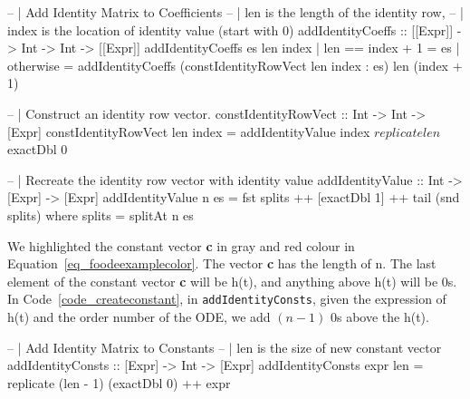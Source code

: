 \begin{listing}
\begin{haskell1}
-- | Add Identity Matrix to Coefficients
-- | len is the length of the identity row,
-- | index is the location of identity value (start with 0)
addIdentityCoeffs :: [[Expr]] -> Int -> Int -> [[Expr]]
addIdentityCoeffs es len index
  | len == index + 1 = es
  | otherwise = addIdentityCoeffs (constIdentityRowVect len index : es) len (index + 1)

-- | Construct an identity row vector.
constIdentityRowVect :: Int -> Int -> [Expr]
constIdentityRowVect len index = addIdentityValue index $ replicate len $ exactDbl 0

-- | Recreate the identity row vector with identity value 
addIdentityValue :: Int -> [Expr] -> [Expr]
addIdentityValue n es = fst splits ++ [exactDbl 1] ++ tail (snd splits)
  where splits = splitAt n es
\end{haskell1}
\label{code_createidentity}
\end{listing}

We highlighted the constant vector \textbf{c} in gray and red colour in Equation~\ref{eq_foodeexamplecolor}. The vector \textbf{c} has the length of n. The last element of the constant vector \textbf{c} will be h(t), and anything above h(t) will be 0s. In Code~\ref{code_createconstant}, in \verb|addIdentityConsts|, given the expression of h(t) and the order number of the ODE, we add $(n-1)$ 0s above the h(t). 

\begin{listing}
\begin{haskell1}
-- | Add Identity Matrix to Constants
-- | len is the size of new constant vector
addIdentityConsts :: [Expr] -> Int -> [Expr]
addIdentityConsts expr len = replicate (len - 1) (exactDbl 0) ++ expr
\end{haskell1}
\label{code_createconstant}
\end{listing}

